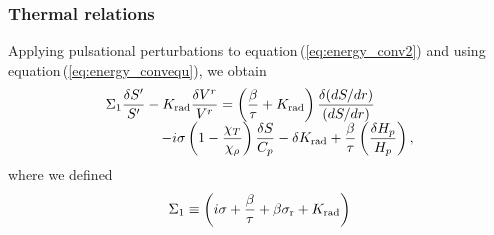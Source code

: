 \documentclass[fleqn,usenatbib]{mnras}
\begin{document}
\subsubsection{Thermal relations}
Applying pulsational perturbations to equation\,(\ref{eq:energy_conv2}) 
and using equation\,(\ref{eq:energy_convequ}),
we obtain
\begin{equation}
\begin{array}{ll}\displaystyle
\Sigma_1{\delta S'\over S'} - K_{\rm rad}{\delta V^r\over V^r}
=
\left({\beta\over\tau}+K_{\rm rad}\right){\delta(dS/dr)\over(dS/dr)}
\cr \displaystyle \qquad \qquad
-i\sigma\left(1-{\chi_T\over\chi_\rho}\right){\delta S\over C_p} 
-\delta K_{\rm rad}+{\beta\over\tau}\left({\delta H_p\over H_p}\right),
\end{array}
\label{eq:energy_convpul2}
\end{equation} 
where we defined
\begin{equation}
\Sigma_1\equiv\left(i\sigma+{\beta\over\tau}+
\beta\sigma_{\rm r}+K_{\rm rad}\right)
\label{eq:Sigma1}
\end{equation}
\end{document}
